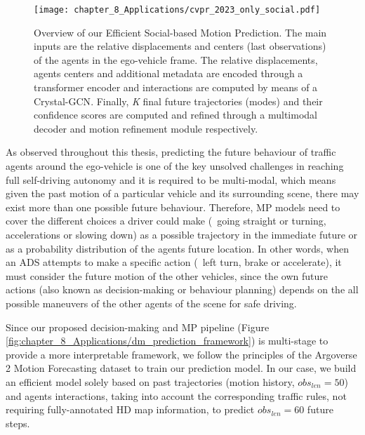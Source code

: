 \begin{figure}[h]
	\centering
	\setlength{\tabcolsep}{2.0pt}
	\texttt{[image: chapter\_8\_Applications/cvpr\_2023\_only\_social.pdf]}
	\captionsetup{justification=justified}
	\caption[Overview of our Efficient Social-based Motion Prediction]{Overview of our Efficient Social-based Motion Prediction. The main inputs are the relative displacements and centers (last observations) of the agents in the ego-vehicle frame. The relative displacements, agents centers and additional metadata are encoded through a transformer encoder and interactions are computed by means of a Crystal-\ac{GCN}. Finally, \textit{K} final future trajectories (modes) and their confidence scores are computed and refined through a multimodal decoder and motion refinement module respectively.}
	
	\label{fig:chapter_8_Applications/cvpr_2023_only_social}
\end{figure}

As observed throughout this thesis, predicting the future behaviour of traffic agents around the ego-vehicle is one of the key unsolved challenges in reaching full self-driving autonomy and it is required to be multi-modal, which means given the past motion of a particular vehicle and its surrounding scene, there may exist more than one possible future behaviour. Therefore, MP models need to cover the different choices a driver could make (\ie \ going straight or turning, accelerations or slowing down) as a possible trajectory in the immediate future or as a probability distribution of the agents future location. In other words, when an \ac{ADS} attempts to make a specific action (\eg \ left turn, brake or accelerate), it must consider the future motion of the other vehicles, since the own future actions (also known as decision-making or behaviour planning) depends on the all possible maneuvers of the other agents of the scene for safe driving. %

Since our proposed decision-making and \ac{MP} pipeline (Figure \ref{fig:chapter_8_Applications/dm_prediction_framework}) is multi-stage to provide a more interpretable framework, we follow the principles of the Argoverse 2 Motion Forecasting dataset \cite{wilson2023argoverse} to train our prediction model. In our case, we build an efficient model solely based on past trajectories (motion history, $obs_{len} = 50$) and agents interactions, taking into account the corresponding traffic rules, not requiring fully-annotated HD map information, to predict $obs_{len} = 60$ future steps. %

